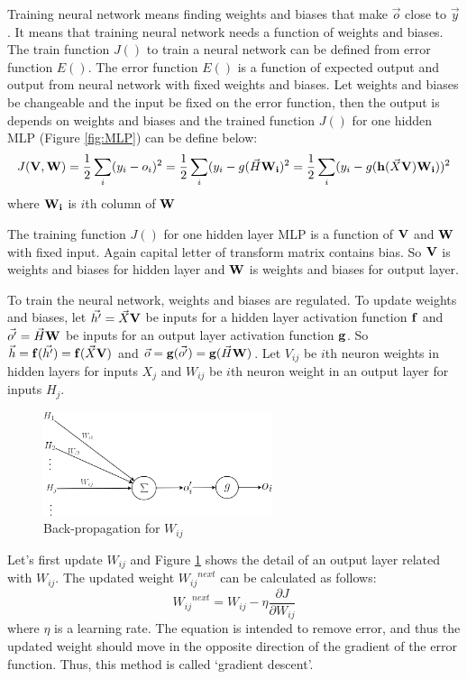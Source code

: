 \documentclass[draft,dvipsnames]{drexel-thesis}
\begin{document}
\begin{thesis}
Training neural network means finding weights and biases that make $\vec{o}$ close to $\vec{y}$. It means that training neural network needs a function of weights and biases. The train function $J()$ to train a neural network can be defined from error function $E()$. The error function $E()$ is a function of expected output and output from neural network with fixed weights and biases. Let weights and biases be changeable and the input be fixed on the error function, then the output is depends on weights and biases and the trained function $J()$ for one hidden MLP (Figure \ref{fig:MLP}) can be define below:
$$J(\bold{V}, \bold{W}) = \frac{1}{2}\sum_{i}(y_i-o_i)^2 = \frac{1}{2}\sum_{i}(y_i-g(\vec{H}\bold{W_i})^2 =\frac{1}{2}\sum_{i}(y_i-g(\bold{h}(\vec{X}\bold{V})\bold{W_i}))^2$$
where $\bold{W_i}$ is $i$th column of $\bold{W}$

The training function $J()$ for one hidden layer MLP is a function of $\bold{V}$ and $\bold{W}$ with fixed input. Again capital letter of transform matrix contains bias. So $\bold{V}$ is weights and biases for hidden layer and $\bold{W}$ is weights and biases for output layer.

To train the neural network, weights and biases are regulated. To update weights and biases, let $\vec{h'}=\vec{X}\bold{V}$ be inputs for a hidden layer activation function $\bold{f}$ and $\vec{o'}=\vec{H}\bold{W}$ be inputs for an output layer activation function $\bold{g}$. So $\vec{h}=\bold{f}(\vec{h'})=\bold{f}(\vec{X}\bold{V})$ and $\vec{o}=\bold{g}(\vec{o'})=\bold{g}(\vec{H}\bold{W})$. Let $V_{ij}$ be $i$th neuron weights in hidden layers for inputs  $X_j$ and $W_{ij}$ be $i$th neuron weight in an output layer for inputs $H_j$.

\begin{figure}[t!]
    \centering
    \includegraphics[width=0.6\textwidth]{pictures/figures/BP1.png}
    \caption{Back-propagation for $W_{ij}$}
    \label{fig:BP1}
\end{figure}

Let's first update $W_{ij}$ and Figure \ref{fig:BP1} shows the detail of an output layer related with ${W_{ij}}$. The updated weight ${{W_{ij}}^{next}}$ can be calculated as follows:
$${{W_{ij}}^{next}}=W_{ij} - \eta\frac{\partial J}{\partial W_{ij}}$$ where $\eta$ is a learning rate. The equation is intended to remove error, and thus the updated weight should  move in the opposite direction of the gradient of the error function. Thus, this method is called `gradient descent'.


\end{thesis}
\end{document}
